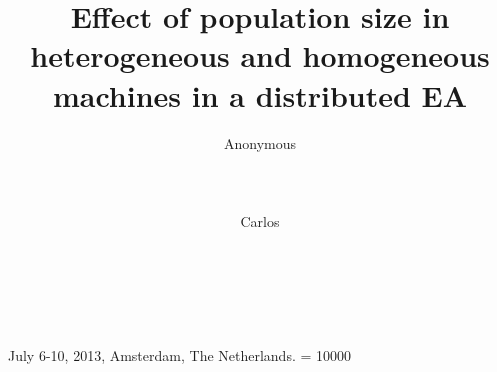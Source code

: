 \documentclass{sig-alternate}
\begin{document}
%
 {July 6-10, 2013, Amsterdam, The Netherlands.}
    \widowpenalty = 10000

\title{Effect of population size in heterogeneous and homogeneous machines in a distributed EA}

%
%
%
%
%


 \author{
 \alignauthor
 Anonymous\\
        \\
        \\
        \\
 \alignauthor
 Carlos\\
 \\
 \\
 \\
 }

\end{document}
